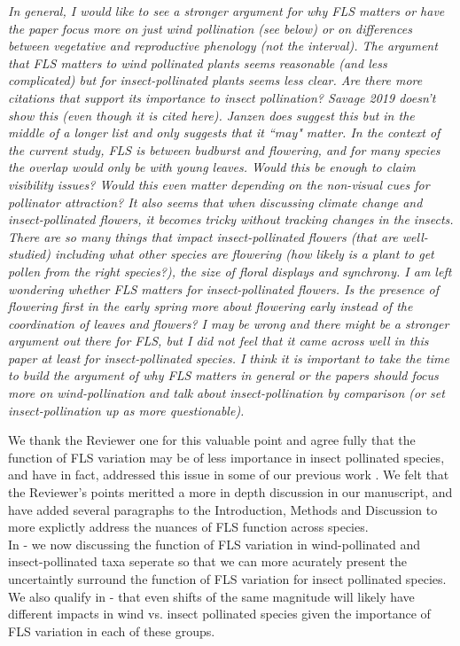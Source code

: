 \documentclass[11pt]{article}
\begin{document}
\emph{In general, I would like to see a stronger argument for why FLS matters or have the paper focus more on just wind pollination (see below) or on differences between vegetative and reproductive phenology (not the interval).  The argument that FLS matters to wind pollinated plants seems reasonable (and less complicated) but for insect-pollinated plants seems less clear. Are there more citations that support its importance to insect pollination? Savage 2019 doesn’t show this (even though it is cited here). Janzen does suggest this but in the middle of a longer list and only suggests that it ``may" matter. In the context of the current study, FLS is between budburst and flowering, and for many species the overlap would only be with young leaves. Would this be enough to claim visibility issues? Would this even matter depending on the non-visual cues for pollinator attraction? It also seems that when discussing climate change and insect-pollinated flowers, it becomes tricky without tracking changes in the insects. There are so many things that impact insect-pollinated flowers (that are well-studied) including what other species are flowering (how likely is a plant to get pollen from the right species?), the size of floral displays and synchrony. I am left wondering whether FLS matters for insect-pollinated flowers. Is the presence of flowering first in the early spring more about flowering early instead of the coordination of leaves and flowers?  I may be wrong and there might be a stronger argument out there for FLS, but I did not feel that it came across well in this paper at least for insect-pollinated species. I think it is important to take the time to build the argument of why FLS matters in general or the papers should focus more on wind-pollination and talk about insect-pollination by comparison (or set insect-pollination up as more questionable).}

We thank the Reviewer one for this valuable point and agree fully that the function of FLS variation may be of less importance in insect pollinated species, and have in fact, addressed this issue in some of our previous work \citep{Buonaiuto2020}. We felt that the Reviewer's points meritted a more in depth discussion in our manuscript, and have added several paragraphs to the Introduction, Methods and Discussion to more explictly address the nuances of FLS function across species.\\

In - we now discussing the function of FLS variation in wind-pollinated and insect-pollinated taxa seperate so that we can more acurately present the uncertaintly surround the function of FLS variation for insect pollinated species. We also qualify in - that even shifts of the same magnitude will likely have different impacts in wind vs. insect pollinated species given the importance of FLS variation in each of these groups.\\
\end{document}
